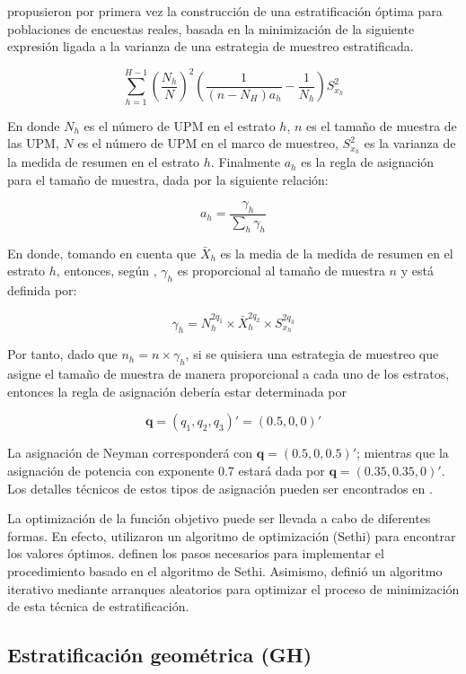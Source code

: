 \documentclass[
  12pt,
  spanish,
]{book}
\begin{document}
\citet{Lavallee_Hidiroglou_1988} propusieron por primera vez la construcción de una estratificación óptima para poblaciones de encuestas reales, basada en la minimización de la siguiente expresión ligada a la varianza de una estrategia de muestreo estratificada.

\[
\sum_{h=1}^{H-1} \left(\frac{N_h}{N}\right)^2\left(\frac{1}{(n-N_H)a_h}-\frac{1}{N_h}\right) S^2_{x_h}
\]

En donde \(N_h\) es el número de UPM en el estrato \(h\), \(n\) es el tamaño de muestra de las UPM, \(N\) es el número de UPM en el marco de muestreo, \(S^2_{x_h}\) es la varianza de la medida de resumen en el estrato \(h\). Finalmente \(a_h\) es la regla de asignación para el tamaño de muestra, dada por la siguiente relación:

\[
a_h = \frac{\gamma_h}{\sum_h \gamma_h}
\]

En donde, tomando en cuenta que \(\bar{X}_h\) es la media de la medida de resumen en el estrato \(h\), entonces, según \citep{Baillargeon_Rivest_2011}, \(\gamma_h\) es proporcional al tamaño de muestra \(n\) y está definida por:

\[
\gamma_h = N_h^{2q_1} \times  \bar{X}_h^{2q_2} \times S^{2q_3}_{x_h}
\]

Por tanto, dado que \(n_h = n \times \gamma_h\), si se quisiera una estrategia de muestreo que asigne el tamaño de muestra de manera proporcional a cada uno de los estratos, entonces la regla de asignación debería estar determinada por

\[
\mathbf q = (q_1, q_2, q_3)' = (0.5, 0, 0)'
\]

La asignación de Neyman corresponderá con \(\mathbf q = (0.5, 0, 0.5)'\); mientras que la asignación de potencia con exponente 0.7 estará dada por \(\mathbf q = (0.35, 0.35, 0)'\). Los detalles técnicos de estos tipos de asignación pueden ser encontrados en \citet{Gutierrez_2016}.

La optimización de la función objetivo puede ser llevada a cabo de diferentes formas. En efecto, \citet{Lavallee_Hidiroglou_1988} utilizaron un algoritmo de optimización (Sethi) para encontrar los valores óptimos. \citet{Baillargeon_Rivest_Ferland_2007} definen los pasos necesarios para implementar el procedimiento basado en el algoritmo de Sethi. Asimismo, \citet{Kozak_2004} definió un algoritmo iterativo mediante arranques aleatorios para optimizar el proceso de minimización de esta técnica de estratificación.

\hypertarget{estratificaciuxf3n-geomuxe9trica-gh}{%
\subsection*{Estratificación geométrica (GH)}\label{estratificaciuxf3n-geomuxe9trica-gh}}
\end{document}
